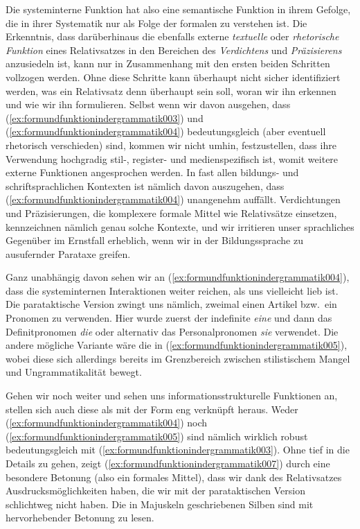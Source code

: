 Die systeminterne Funktion hat also eine semantische Funktion in ihrem Gefolge, die in ihrer Systematik nur als Folge der formalen zu verstehen ist.
Die Erkenntnis, dass darüberhinaus die ebenfalls externe \textit{textuelle} oder \textit{rhetorische Funktion} eines Relativsatzes in den Bereichen des \textit{Verdichtens} und \textit{Präzisierens} anzusiedeln ist, kann nur in Zusammenhang mit den ersten beiden Schritten vollzogen werden.
Ohne diese Schritte kann überhaupt nicht sicher identifiziert werden, was ein Relativsatz denn überhaupt sein soll, woran wir ihn erkennen und wie wir ihn formulieren.
Selbst wenn wir davon ausgehen, dass (\ref{ex:formundfunktionindergrammatik003}) und (\ref{ex:formundfunktionindergrammatik004}) bedeutungsgleich (aber eventuell rhetorisch verschieden) sind, kommen wir nicht umhin, festzustellen, dass ihre Verwendung hochgradig stil-, register- und medienspezifisch ist, womit weitere externe Funktionen angesprochen werden.
In fast allen bildungs- und schriftsprachlichen Kontexten ist nämlich davon auszugehen, dass (\ref{ex:formundfunktionindergrammatik004}) unangenehm auffällt.
Verdichtungen und Präzisierungen, die komplexere formale Mittel wie Relativsätze einsetzen, kennzeichnen nämlich genau solche Kontexte, und wir irritieren unser sprachliches Gegenüber im Ernstfall erheblich, wenn wir in der Bildungssprache zu ausufernder Parataxe greifen.

Ganz unabhängig davon sehen wir an (\ref{ex:formundfunktionindergrammatik004}), dass die systeminternen Interaktionen weiter reichen, als uns vielleicht lieb ist.
Die parataktische Version zwingt uns nämlich, zweimal einen Artikel bzw.\ ein Pronomen zu verwenden.
Hier wurde zuerst der indefinite \textit{eine} und dann das Definitpronomen \textit{die} oder alternativ das Personalpronomen \textit{sie} verwendet.
Die andere mögliche Variante wäre die in (\ref{ex:formundfunktionindergrammatik005}), wobei diese sich allerdings bereits im Grenzbereich zwischen stilistischem Mangel und Ungrammatikalität bewegt.

\begin{exe}
\end{exe}

Gehen wir noch weiter und sehen uns informationsstrukturelle Funktionen an, stellen sich auch diese als mit der Form eng verknüpft heraus.
Weder (\ref{ex:formundfunktionindergrammatik004}) noch (\ref{ex:formundfunktionindergrammatik005}) sind nämlich wirklich robust bedeutungsgleich mit (\ref{ex:formundfunktionindergrammatik003}).
Ohne tief in die Details zu gehen, zeigt (\ref{ex:formundfunktionindergrammatik007}) durch eine besondere Betonung (also ein formales Mittel), dass wir dank des Relativsatzes Ausdrucksmöglichkeiten haben, die wir mit der parataktischen Version schlichtweg nicht haben.
Die in Majuskeln geschriebenen Silben sind mit hervorhebender Betonung zu lesen.

